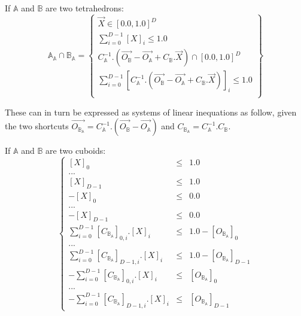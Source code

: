 \documentclass[12pt, a4paper]{article}
\begin{document}
If $\mathbb{A}$ and $\mathbb{B}$ are two tetrahedrons:
\begin{equation}
\mathbb{A}_\mathbb{A}\cap\mathbb{B}_\mathbb{A}=\left\lbrace
\begin{array}{c}
\overrightarrow{X}\in[0.0,1.0]^D\\
\sum_{i=0}^{D-1}\left[X\right]_i\le1.0\\
C_\mathbb{A}^{-1}.(\overrightarrow{O_\mathbb{B}}-\overrightarrow{O_\mathbb{A}}+C_\mathbb{B}.\overrightarrow{X})\cap[0.0,1.0]^D\\
\sum_{i=0}^{D-1}\left[C_\mathbb{A}^{-1}.\left(\overrightarrow{O_\mathbb{B}}-\overrightarrow{O_\mathbb{A}}+C_\mathbb{B}.\overrightarrow{X}\right)\right]_i\le1.0\\
\end{array}
\right\rbrace
\end{equation}

These can in turn be expressed as systems of linear inequations as follow, given the two shortcuts $\overrightarrow{O_{\mathbb{B}_\mathbb{A}}}=C_\mathbb{A}^{-1}.(\overrightarrow{O_\mathbb{B}}-\overrightarrow{O_\mathbb{A}})$ and $C_{\mathbb{B}_\mathbb{A}}=C_\mathbb{A}^{-1}.C_{\mathbb{B}}$.

If $\mathbb{A}$ and $\mathbb{B}$ are two cuboids:
\begin{equation}
\left\lbrace
\begin{array}{rcl}
\left[X\right]_0&\le&1.0\\
...\\
\left[X\right]_{D-1}&\le&1.0\\
-\left[X\right]_0&\le&0.0\\
...\\
-\left[X\right]_{D-1}&\le&0.0\\
\sum_{i=0}^{D-1}\left[C_{\mathbb{B}_\mathbb{A}}\right]_{0,i}.\left[X\right]_i&\le&1.0-\left[O_{\mathbb{B}_\mathbb{A}}\right]_0\\
...\\
\sum_{i=0}^{D-1}\left[C_{\mathbb{B}_\mathbb{A}}\right]_{D-1,i}.\left[X\right]_i&\le&1.0-\left[O_{\mathbb{B}_\mathbb{A}}\right]_{D-1}\\
-\sum_{i=0}^{D-1}\left[C_{\mathbb{B}_\mathbb{A}}\right]_{0,i}.\left[X\right]_i&\le&\left[O_{\mathbb{B}_\mathbb{A}}\right]_0\\
...\\
-\sum_{i=0}^{D-1}\left[C_{\mathbb{B}_\mathbb{A}}\right]_{D-1,i}.\left[X\right]_i&\le&\left[O_{\mathbb{B}_\mathbb{A}}\right]_{D-1}
\end{array}
\right.
\end{equation}
\end{document}
